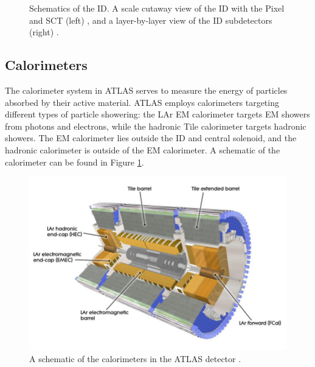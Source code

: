 \begin{figure}[!thp]
\begin{minipage}[c]{.45\textwidth}
    \end{minipage}
    \caption[Schematics of the \gls{ID}]{Schematics of the \gls{ID}. A scale cutaway view of the \gls{ID} with the Pixel and \gls{SCT} (left) \cite{pixel-electronics}, and a layer-by-layer view of the \gls{ID} subdetectors (right) \cite{id-perf2015}.}
\end{figure}
    

\subsection{Calorimeters} \label{ssec:calorimeters}
The calorimeter system in ATLAS serves to measure the energy of particles absorbed by their active material. ATLAS employs calorimeters targeting different types of particle showering: the \gls{LAr} \gls{EM} calorimeter targets \gls{EM} showers from photons and electrons, while the hadronic Tile calorimeter targets hadronic showers. The \gls{EM} calorimeter lies outside the \gls{ID} and central solenoid, and the hadronic calorimeter is outside of the \gls{EM} calorimeter.  A schematic of the calorimeter can be found in Figure \ref{fig:calorimeter}.


\begin{figure}[!ht]
    \centering
    \includegraphics[width=.7\textwidth]{chapters/chapter2_experiment/images/calorimeter.jpeg}
    \caption{A schematic of the calorimeters in the ATLAS detector \cite{atlas-experiment}.}
    \label{fig:calorimeter}
\end{figure}

